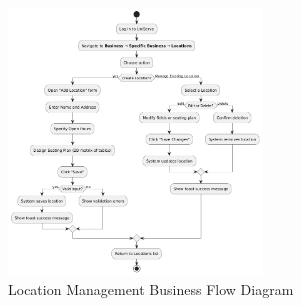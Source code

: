 \documentclass[]{VUMIFTemplateClass}
\begin{document}
\begin{figure}[H]
    \centering
    \includegraphics[width=0.6\textwidth]{docs/ps-design/design-document/images/diagrams/business/bpmn_manage_locations.png}
    \caption{Location Management Business Flow Diagram}
    \label{fig:manage_locations_business_flow}
\end{figure}
\end{document}
